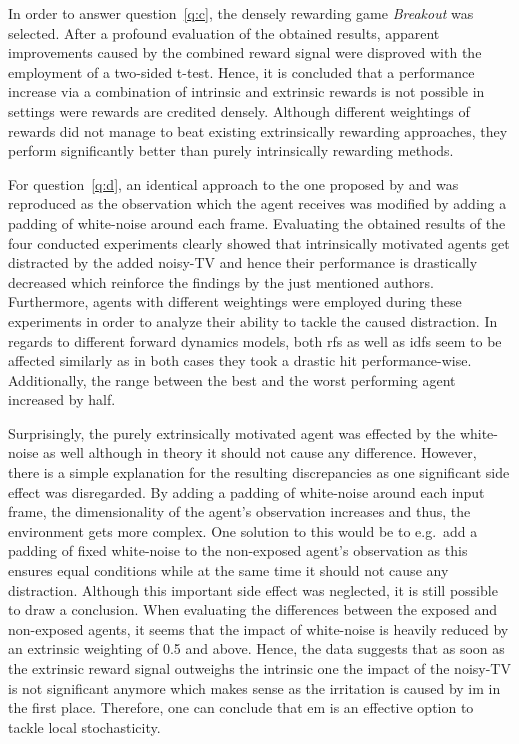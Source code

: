 \documentclass[draft,final]{vutinfth} %
\begin{document}
    In order to answer question~\ref{q:c}, the densely rewarding game \textit{Breakout} was selected.
    After a profound evaluation of the obtained results, apparent improvements caused by the combined reward signal were disproved with the employment of a two-sided t-test.
    Hence, it is concluded that a performance increase via a combination of intrinsic and extrinsic rewards is not possible in settings were rewards are credited densely.
    Although different weightings of rewards did not manage to beat existing extrinsically rewarding approaches, they perform significantly better than purely intrinsically rewarding methods.

    For question~\ref{q:d}, an identical approach to the one proposed by \citet{pathak_curiosity-driven_2017-1} and \citet{burda_large-scale_2018-1} was reproduced as the observation which the agent receives was modified by adding a padding of white-noise around each frame.
    Evaluating the obtained results of the four conducted experiments clearly showed that intrinsically motivated agents get distracted by the added noisy-TV and hence their performance is drastically decreased which reinforce the findings by the just mentioned authors.
    Furthermore, agents with different weightings were employed during these experiments in order to analyze their ability to tackle the caused distraction.
    In regards to different forward dynamics models, both \glspl{rf} as well as \glspl{idf} seem to be affected similarly as in both cases they took a drastic hit performance-wise.
    Additionally, the range between the best and the worst performing agent increased by half.

    Surprisingly, the purely extrinsically motivated agent was effected by the white-noise as well although in theory it should not cause any difference.
    However, there is a simple explanation for the resulting discrepancies as one significant side effect was disregarded.
    By adding a padding of white-noise around each input frame, the dimensionality of the agent's observation increases and thus, the environment gets more complex.
    One solution to this would be to e.g.\ add a padding of fixed white-noise to the non-exposed agent's observation as this ensures equal conditions while at the same time it should not cause any distraction.
    Although this important side effect was neglected, it is still possible to draw a conclusion.
    When evaluating the differences between the exposed and non-exposed agents, it seems that the impact of white-noise is heavily reduced by an extrinsic weighting of 0.5 and above.
    Hence, the data suggests that as soon as the extrinsic reward signal outweighs the intrinsic one the impact of the noisy-TV is not significant anymore which makes sense as the irritation is caused by \gls{im} in the first place.
    Therefore, one can conclude that \gls{em} is an effective option to tackle local stochasticity.
\end{document}
